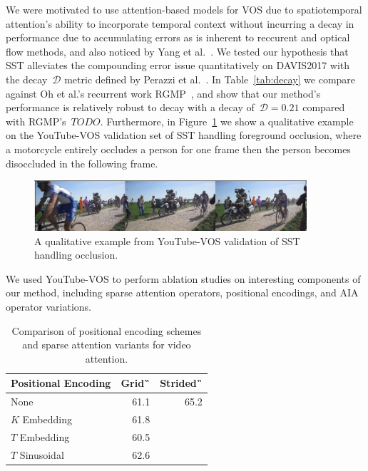 We were motivated to use attention-based models for VOS due to spatiotemporal
attention's ability to incorporate temporal context without incurring a decay
in performance due to accumulating errors as is inherent to reccurent and
optical flow methods, and also noticed by Yang et al.~\cite{yang2019anchor}.
We tested our hypothesis that SST alleviates the compounding error issue
quantitatively on DAVIS2017 with the decay~$\mathcal{D}$ metric defined by
Perazzi et al.~\cite{perazzi2016abenchmark}.
In Table~\ref{tab:decay} we compare against Oh et al.'s recurrent work
RGMP~\cite{oh2018fast}, and show that our method's performance is relatively
robust to decay with a decay of~$\mathcal{D} = 0.21$ compared with
RGMP's~$TODO$.
Furthermore, in Figure~\ref{fig:ainaocclusion} we show a qualitative example on
the YouTube-VOS validation set of SST handling foreground occlusion, where a
motorcycle entirely occludes a person for one frame then the person becomes
disoccluded in the following frame.

\begin{figure}
\centering
\includegraphics[width=0.9\textwidth]{Figures/aina-occlusion}
\caption{A qualitative example from YouTube-VOS validation of SST handling
         occlusion.}
\label{fig:ainaocclusion}
\end{figure}

We used YouTube-VOS to perform ablation studies on interesting components of
our method, including sparse attention operators, positional encodings, and AIA
operator variations.

\begin{table}
\caption{Comparison of positional encoding schemes and sparse attention
         variants for video attention.}
\centering
\begin{tabular}{lrr}
\toprule
Positional Encoding & Grid~\G{} & Strided~\G{} \\
\midrule
None & \num{61.1} & 65.2 \\
$K$ Embedding & \num{61.8} & \\
$T$ Embedding & \num{60.5} & \\
$T$ Sinusoidal & \num{62.6} & \\
\bottomrule
\end{tabular}
\label{tab:pos-encoding}
\end{table}

